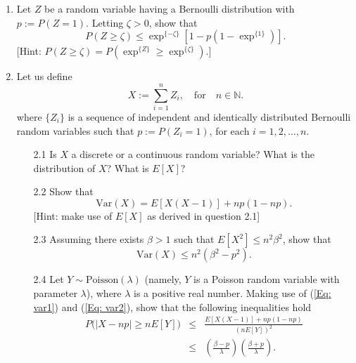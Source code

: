 \documentclass[12pt,thmsa]{article}
\begin{document}
\begin{enumerate}
 
\item Let $Z$ be a random variable having a Bernoulli distribution with  $p:=P(Z=1)$. Letting
$\zeta>0$, show that
$$
P(Z \geq \zeta) \leq \exp^{\{-\zeta\}} [1-p(1-\exp^{\{1\}})]. %
$$
[Hint: $P(Z \geq  \zeta) = P (\exp^{\{Z\}}\geq \exp^{\{\zeta\}})$.]  \\
 

 
\item Let us define
$$
X := \sum_{i=1}^n Z_i, \quad \text{for} \quad n \in \mathbb{N}.
$$
where $\{Z_i\}$ is a sequence of independent and identically distributed Bernoulli random variables such that $p:=P(Z_i=1)$, for each $i=1,2,...,n$.
 
 
 
\begin{itemize}
     \item[2.1] Is $X$ a discrete or a continuous random variable? What is the distribution of $X$? What is $E[X]$?
            \item[2.2] Show that
             \begin{equation} \label{Eq: var1}
             \text{Var}(X) = E[X(X-1)]+np(1-np).
             \end{equation}
   [Hint: make use of $E[X]$ as derived in question 2.1]
           
    \item[2.3] Assuming there exists $\beta > 1$ such that $E[X^2]\leq n^2\beta^2$, show that
             \begin{equation} \label{Eq: var2}
             \text{Var}(X) \leq n^2(\beta^2 -p^2).
             \end{equation}

            \item[2.4] Let $Y \sim \text{Poisson}(\lambda)$ (namely, $Y$ is a Poisson random variable with parameter $\lambda$), where $\lambda$ is a positive real number. Making use of (\ref{Eq: var1}) and (\ref{Eq: var2}), show that the following inequalities hold
            \begin{eqnarray*}
    P\Big( \vert X-np \vert \geq nE[Y] \Big) & \leq & \frac{E[X(X-1)]+np(1-np)}{(nE[Y])^2}  \\
        & \leq & \left(\frac{\beta -p }{\lambda}\right) \left(\frac{\beta + p}{\lambda} \right).
            \end{eqnarray*}
\end{itemize}
           
 
\end{enumerate}
\end{document}
